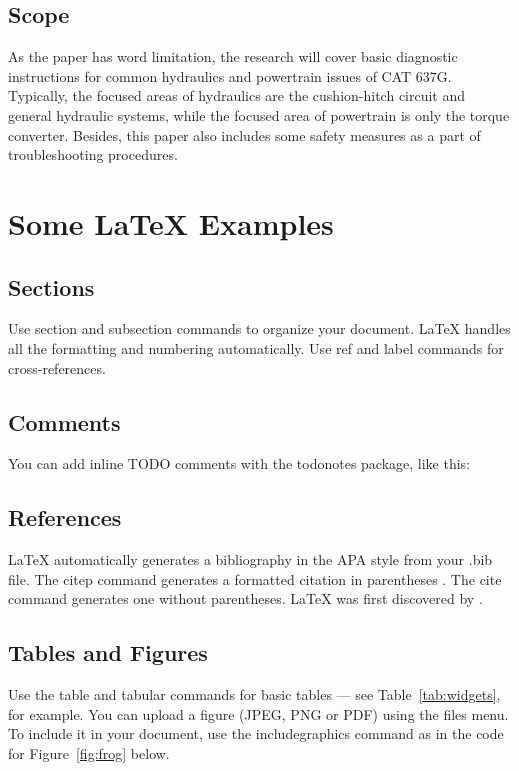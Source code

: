 \documentclass[a4paper,man,natbib]{apa6}
\begin{document}
\subsection{Scope}

As the paper has word limitation, the research will cover basic diagnostic instructions for common hydraulics and powertrain issues of CAT 637G. Typically, the focused areas of hydraulics are the cushion-hitch circuit and general hydraulic systems, while the focused area of powertrain is only the torque converter. Besides, this paper also includes some safety measures as a part of troubleshooting procedures.

\section{Some \LaTeX{} Examples}
\label{sec:examples}

\subsection{Sections}

Use section and subsection commands to organize your document. \LaTeX{} handles all the formatting and numbering automatically. Use ref and label commands for cross-references.


\subsection{Comments}

You can add inline TODO comments with the todonotes package, like this:

\subsection{References}

LaTeX automatically generates a bibliography in the APA style from your .bib file. The citep command generates a formatted citation in parentheses \cite{Lamport1986}. The cite command generates one without parentheses. LaTeX was first discovered by \cite{Lamport1986}.

\subsection{Tables and Figures}

Use the table and tabular commands for basic tables --- see Table~\ref{tab:widgets}, for example. You can upload a figure (JPEG, PNG or PDF) using the files menu. To include it in your document, use the includegraphics command as in the code for Figure~\ref{fig:frog} below.
\end{document}
